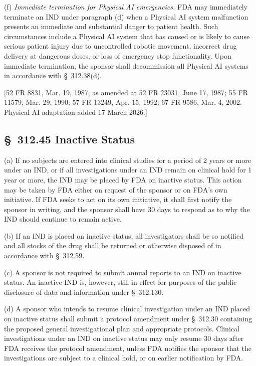 \documentclass[11pt]{article}
\begin{document}
(f) \textit{Immediate termination for Physical AI emergencies.} FDA may immediately terminate an IND under paragraph (d) when a Physical AI system malfunction presents an immediate and substantial danger to patient health. Such circumstances include a Physical AI system that has caused or is likely to cause serious patient injury due to uncontrolled robotic movement, incorrect drug delivery at dangerous doses, or loss of emergency stop functionality. Upon immediate termination, the sponsor shall decommission all Physical AI systems in accordance with \S~312.38(d).

[52 FR 8831, Mar. 19, 1987, as amended at 52 FR 23031, June 17, 1987; 55 FR 11579, Mar. 29, 1990; 57 FR 13249, Apr. 15, 1992; 67 FR 9586, Mar. 4, 2002. Physical AI adaptation added 17 March 2026.]

\subsection{\S~312.45 Inactive Status}

(a) If no subjects are entered into clinical studies for a period of 2 years or more under an IND, or if all investigations under an IND remain on clinical hold for 1 year or more, the IND may be placed by FDA on inactive status. This action may be taken by FDA either on request of the sponsor or on FDA's own initiative. If FDA seeks to act on its own initiative, it shall first notify the sponsor in writing, and the sponsor shall have 30 days to respond as to why the IND should continue to remain active.

(b) If an IND is placed on inactive status, all investigators shall be so notified and all stocks of the drug shall be returned or otherwise disposed of in accordance with \S~312.59.

(c) A sponsor is not required to submit annual reports to an IND on inactive status. An inactive IND is, however, still in effect for purposes of the public disclosure of data and information under \S~312.130.

(d) A sponsor who intends to resume clinical investigation under an IND placed on inactive status shall submit a protocol amendment under \S~312.30 containing the proposed general investigational plan and appropriate protocols. Clinical investigations under an IND on inactive status may only resume 30 days after FDA receives the protocol amendment, unless FDA notifies the sponsor that the investigations are subject to a clinical hold, or on earlier notification by FDA.
\end{document}
